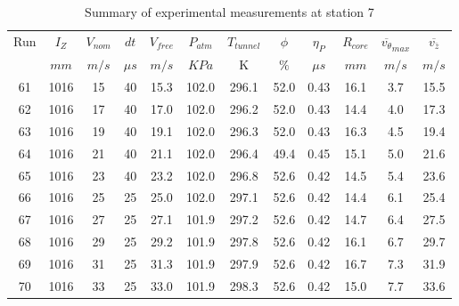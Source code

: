 \begin{table}[H]
\begin{center}
\begin{tabular}{|cccccccccccc|}
	\hline
	Run & $I_Z$ & $V_{nom}$ & $dt$ & $V_{free}$ & $P_{atm}$ & $T_{tunnel}$ & $\phi$ & $\eta_P$ & $R_{core}$ & $\overline{v_{\theta}}_{max}$ & $\overline{v_{\bar{z}}}$\\
	  & $mm$ & $m/s$ & $\mu s$ & $m/s$ & $KPa$ & K & $\%$ & $\mu s$ & $mm$ & $m/s$ & $m/s$\\
	\hline
	61 & 1016 & 15 & 40 & 15.3 & 102.0 & 296.1 & 52.0 & 0.43 & 16.1 & 3.7 & 15.5\\
	62 & 1016 & 17 & 40 & 17.0 & 102.0 & 296.2 & 52.0 & 0.43 & 14.4 & 4.0 & 17.3\\
	63 & 1016 & 19 & 40 & 19.1 & 102.0 & 296.3 & 52.0 & 0.43 & 16.3 & 4.5 & 19.4\\
	64 & 1016 & 21 & 40 & 21.1 & 102.0 & 296.4 & 49.4 & 0.45 & 15.1 & 5.0 & 21.6\\
	65 & 1016 & 23 & 40 & 23.2 & 102.0 & 296.8 & 52.6 & 0.42 & 14.5 & 5.4 & 23.6\\
	66 & 1016 & 25 & 25 & 25.0 & 102.0 & 297.1 & 52.6 & 0.42 & 14.4 & 6.1 & 25.4\\
	67 & 1016 & 27 & 25 & 27.1 & 101.9 & 297.2 & 52.6 & 0.42 & 14.7 & 6.4 & 27.5\\
	68 & 1016 & 29 & 25 & 29.2 & 101.9 & 297.8 & 52.6 & 0.42 & 16.1 & 6.7 & 29.7\\
	69 & 1016 & 31 & 25 & 31.3 & 101.9 & 297.9 & 52.6 & 0.42 & 16.7 & 7.3 & 31.9\\
	70 & 1016 & 33 & 25 & 33.0 & 101.9 & 298.3 & 52.6 & 0.42 & 15.0 & 7.7 & 33.6\\
	\hline
\end{tabular}
\caption{Summary of experimental measurements at station 7}
\label{table:experiment_results_7}
\end{center}
\end{table}
